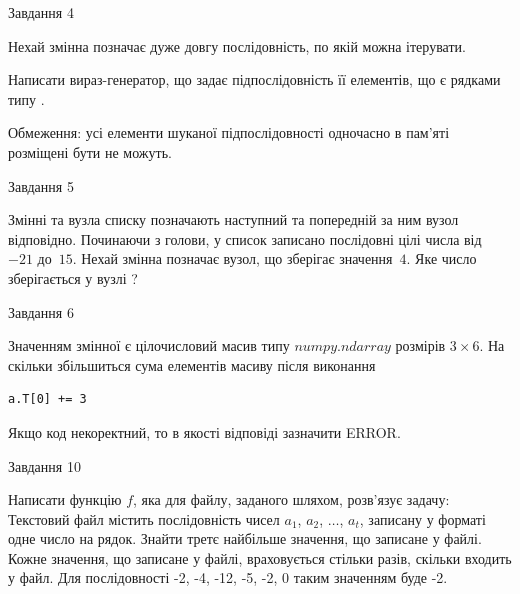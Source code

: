 \documentclass[12pt, ukrainian]{article}
\begin{document}
{\begin{minipage}[t]{8.0cm}
\end{minipage}


               
{\begin{center}Завдання {4}\end{center}}
\vspace{-4mm}
Нехай змінна  позначає дуже довгу послідовність, по якій можна ітерувати.

Написати вираз-генератор, що задає підпослідовність її елементів, що є рядками типу .

Обмеження: усі елементи шуканої підпослідовності одночасно в пам'яті розміщені бути не можуть.\par

\vspace{10mm}
               
{\begin{center}Завдання {5}\end{center}}
\vspace{-4mm}
Змінні  та  вузла списку позначають наступний та попередній за ним вузол відповідно. Починаючи з голови, у список записано послідовні цілі числа від~$-21$ до~$15$. Нехай змінна  позначає вузол, що зберігає значення~$4$.
Яке число зберігається у вузлі  ?\par

               
{\begin{center}Завдання {6}\end{center}}
\vspace{-4mm}
Значенням змінної  є цілочисловий масив типу $numpy.ndarray$ розмірів $3{\times}6$. На скільки збільшиться сума елементів масиву  після виконання
\begin{verbatim}
a.T[0] += 3
\end{verbatim}


Якщо код некоректний, то в якості відповіді зазначити ERROR.\par

               
{\begin{center}Завдання {10}\end{center}}
\vspace{-4mm}

Написати функцію $f$, яка для файлу, заданого шляхом, розв’язує задачу:\\ Текстовий файл містить послідовність чисел $a_1$, $a_2$, $\ldots$, $a_t$, записану у форматі одне число на рядок. Знайти третє найбільше значення, що записане у файлі. Кожне значення, що записане у файлі, враховується стільки разів, скільки входить у файл. Для послідовності -2, -4, -12, -5, -2, 0 таким значенням буде -2.

}
\end{document}

